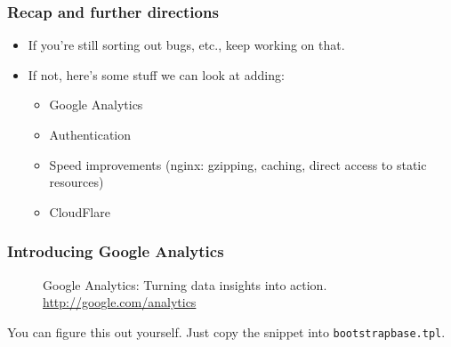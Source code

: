 \documentclass{beamer}
\begin{document}
\begin{frame}
  \frametitle{Recap and further directions}
  \begin{itemize}
  \item If you're still sorting out bugs, etc., keep working on that.
  \item If not, here's some stuff we can look at adding:
    \begin{itemize}
    \item Google Analytics
    \item Authentication
    \item Speed improvements (nginx: gzipping, caching, direct access
      to static resources)
    \item CloudFlare
    \end{itemize}
  \end{itemize}
\end{frame}

\begin{frame}
  \frametitle{Introducing Google Analytics}
  \begin{figure}[h!]
    \centering
    
    \caption{Google Analytics: Turning data insights into action. \url{http://google.com/analytics}}
    \label{fig:ga_logo}
  \end{figure}

  You can figure this out yourself. Just copy the snippet into \texttt{bootstrapbase.tpl}.
  
\end{frame}
\end{document}
